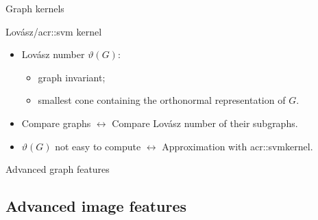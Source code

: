 \documentclass[12pt]{beamer}
\begin{document}
            \begin{frame}{Graph kernels}
                \centering
                
            \end{frame}

            \begin{frame}{Lov\'asz/\texorpdfstring{\acrshort*{acr::svm}}{SVM} kernel}
                \begin{itemize}[label=\(\blacktriangleright\), font=\color{IGNGreen}, itemsep=2em]
                    \item<1-> Lov\'asz number \(\vartheta\left(G\right)\):
                    \begin{itemize}[label=\(\blacktriangleright\), font=\color{IGNGreen}]
                        \item<2-> graph invariant;
                        \item<3-> smallest cone containing the orthonormal representation of \(G\).
                    \end{itemize}
                    \item<4-> Compare graphs \(\longleftrightarrow\) Compare Lov\'asz number of their subgraphs.
                    \item<5-> \(\vartheta\left(G\right)\) not easy to compute \(\longleftrightarrow\) Approximation with \gls{acr::svm}kernel.
                \end{itemize}
            \end{frame}

            \begin{frame}{Advanced graph features}
                \raggedleft
                
            \end{frame}

        \subsection{Advanced image features}
            
\end{document}
